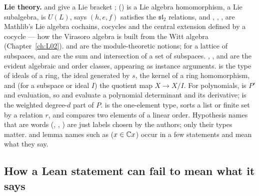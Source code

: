 \textbf{Lie theory.}  and  give a Lie bracket ;
 () is a Lie algebra homomorphism,  a Lie
subalgebra,  is $U(L)$,  says $(h,e,f)$
satisfies the $\mathfrak{sl}_2$ relations, and , , ,
 are Mathlib's Lie algebra cochains, cocycles and the central extension
defined by a cocycle --- how the Virasoro algebra is built from the Witt algebra (Chapter~\ref{ch:L02}).
 and  are the module-theoretic notions; for a lattice
of subspaces,  and  are the sum and intersection of a set of subspaces.
, ,  and  are the evident
algebraic and order classes, appearing as instance arguments.  is the type of ideals of a
ring,  the ideal generated by $s$,  the kernel of a ring
homomorphism, and  (for a subspace or ideal $I$) the quotient map $X\to X/I$. For
polynomials,  is $P'$ and  evaluation, so  and
 evaluate a polynomial determinant and its derivative;  is the weighted
degree-$d$ part of $P$.  is the one-element type,  sorts a list or finite set
by a relation $r$, and  compares two elements of a linear order. Hypothesis names that are
words (, , ) are just labels chosen by the authors; only their types
matter.  and lemma names such as
 ($x\in{\mathbb{C}} x$) occur in a few statements and mean what they say.

\subsection{How a Lean statement can fail to mean what it says}\label{ch01:sec:failures}

